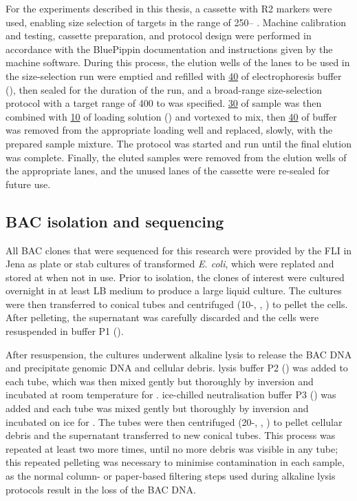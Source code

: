 For the experiments described in this thesis, a  cassette with R2 markers were used, enabling size selection of targets in the range of 250-- \parencite{sage2016bluepippin}. Machine calibration and testing, cassette preparation, and protocol design were performed in accordance with the BluePippin documentation and instructions given by the machine software. During this process, the elution wells of the lanes to be used in the size-selection run were emptied and refilled with \ul{40} of electrophoresis buffer (), then sealed for the duration of the run, and a broad-range size-selection protocol with a target range of 400 to  was specified. \ul{30} of sample was then combined with \ul{10} of loading solution () and vortexed to mix, then \ul{40} of buffer was removed from the appropriate loading well and replaced, slowly, with the prepared sample mixture. The protocol was started and run until the final elution was complete. Finally, the eluted samples were removed from the elution wells of the appropriate lanes, and the unused lanes of the cassette were re-sealed for future use.

\subsection{BAC isolation and sequencing}
\label{sec:methods_molec_bacs}

All BAC clones that were sequenced for this research were provided by the FLI in Jena as plate or stab cultures of transformed \textit{E. coli}, which were replated and stored at  when not in use. Prior to isolation, the clones of interest were cultured overnight in at least  LB medium to produce a large liquid culture. The cultures were then transferred to  conical tubes and centrifuged (10-, , ) to pellet the cells. After pelleting, the supernatant was carefully discarded and the cells were resuspended in  buffer P1 ().


After resuspension, the cultures underwent alkaline lysis to release the BAC DNA and precipitate genomic DNA and cellular debris.  lysis buffer P2 () was added to each tube, which was then mixed gently but thoroughly by inversion and incubated at room temperature for .  ice-chilled neutralisation buffer P3 () was added and each tube was mixed gently but thoroughly by inversion and incubated on ice for . The tubes were then centrifuged (20-, , ) to pellet cellular debris and the supernatant transferred to new conical tubes. This process was repeated at least two more times, until no more debris was visible in any tube; this repeated pelleting was necessary to minimise contamination in each sample, as the normal column- or paper-based filtering steps used during alkaline lysis protocols result in the loss of the BAC DNA.

